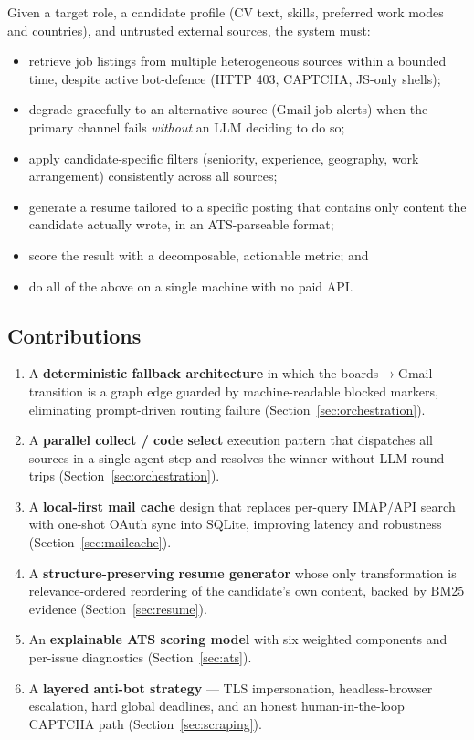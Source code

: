 \documentclass[11pt,a4paper]{article}
\begin{document}
Given a target role, a candidate profile (CV text, skills, preferred work
modes and countries), and untrusted external sources, the system must:

\begin{itemize}[leftmargin=2em]
  \item retrieve job listings from multiple heterogeneous sources within a
        bounded time, despite active bot-defence (HTTP 403, CAPTCHA,
        JS-only shells);
  \item degrade gracefully to an alternative source (Gmail job alerts) when
        the primary channel fails \emph{without} an LLM deciding to do so;
  \item apply candidate-specific filters (seniority, experience, geography,
        work arrangement) consistently across all sources;
  \item generate a resume tailored to a specific posting that contains only
        content the candidate actually wrote, in an ATS-parseable format;
  \item score the result with a decomposable, actionable metric; and
  \item do all of the above on a single machine with no paid API.
\end{itemize}

\subsection{Contributions}
\label{sec:contrib}

\begin{enumerate}[leftmargin=2em]
  \item A \textbf{deterministic fallback architecture} in which the
        boards$\rightarrow$Gmail transition is a graph edge guarded by
        machine-readable blocked markers, eliminating prompt-driven routing
        failure (Section~\ref{sec:orchestration}).
  \item A \textbf{parallel collect / code select} execution pattern that
        dispatches all sources in a single agent step and resolves the
        winner without LLM round-trips (Section~\ref{sec:orchestration}).
  \item A \textbf{local-first mail cache} design that replaces per-query
        IMAP/API search with one-shot OAuth sync into SQLite, improving
        latency and robustness (Section~\ref{sec:mailcache}).
  \item A \textbf{structure-preserving resume generator} whose only
        transformation is relevance-ordered reordering of the candidate's own
        content, backed by BM25 evidence (Section~\ref{sec:resume}).
  \item An \textbf{explainable ATS scoring model} with six weighted
        components and per-issue diagnostics (Section~\ref{sec:ats}).
  \item A \textbf{layered anti-bot strategy} --- TLS impersonation,
        headless-browser escalation, hard global deadlines, and an honest
        human-in-the-loop CAPTCHA path (Section~\ref{sec:scraping}).
\end{enumerate}
\end{document}
